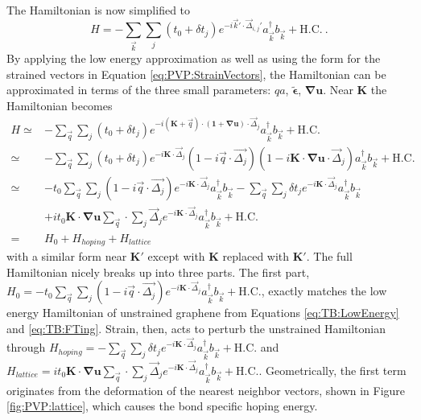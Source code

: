 The Hamiltonian is now simplified to
\begin{equation*}
    H=-\sum_{\vec{k}} \sum_{j} \left( t_0+\delta t_j \right)
    e^{-i\vec{k}'\cdot \vec{\Delta}_{i,j}'}
    a_{\vec{k}}^{\dagger} b_{\vec{k}} +\text{H.C.} \ .
\end{equation*}
By applying the low energy approximation as well as using the form for the strained vectors in Equation \ref{eq:PVP:StrainVectors}, the Hamiltonian can be approximated in terms of the three small parameters: $qa$, $\tilde{\bm{\epsilon}}$, $\bm{\nabla u}$.
Near $\bm{K}$ the Hamiltonian becomes 
\begin{align*}
  H\simeq& -\sum_{\vec{q}} \sum_{j} \left( t_0+\delta t_j \right)
    e^{-i (\bm{K}+\vec{q}) \cdot (\bm{1}+\bm{\nabla u}) \cdot \vec{\Delta}_{j}}
    a_{\vec{k}}^{\dagger} b_{\vec{k}} +\text{H.C.} \\
   \simeq& -\sum_{\vec{q}} \sum_{j} \left( t_0+\delta t_j \right) e^{-i \bm{K} \cdot \vec{\Delta}_j}
    (1-i \vec{q} \cdot \vec{\Delta_j}) (1-i\bm{K}\cdot \bm{\nabla u} \cdot \vec{\Delta}_j)
    a_{\vec{k}}^{\dagger} b_{\vec{k}} +\text{H.C.} \\
   \simeq& 
    -t_0 \sum_{\vec{q}} \sum_{j} (1-i\vec{q} \cdot \vec{\Delta_j}) e^{-i \bm{K} \cdot \vec{\Delta}_j} a_{\vec{k}}^{\dagger}b_{\vec{k}}
    -\sum_{\vec{q}} \sum_{j} \delta t_j e^{-i \bm{K} \cdot \vec{\Delta}_j} a_{\vec{k}}^{\dagger}b_{\vec{k}} \\
    &+i t_0 \bm{K} \cdot \bm{\nabla u} \sum_{\vec{q}} \cdot \sum_{j} \vec{\Delta}_j e^{-i \bm{K} \cdot \vec{\Delta}_j} a_{\vec{k}}^{\dagger}b_{\vec{k}}
    +\text{H.C.} \\
   =& H_0+H_{hoping}+H_{lattice}
\end{align*}
with a similar form near $\bm{K'}$ except with $\bm{K}$ replaced with $\bm{K'}$.
The full Hamiltonian nicely breaks up into three parts.
The first part, $H_0=-t_0 \sum_{\vec{q}} \sum_{j} (1-i\vec{q} \cdot \vec{\Delta_j}) e^{-i \bm{K} \cdot \vec{\Delta}_j} a_{\vec{k}}^{\dagger}b_{\vec{k}}+\text{H.C.}$, exactly matches the low energy Hamiltonian of unstrained graphene from Equations \ref{eq:TB:LowEnergy} and \ref{eq:TB:FTing}.
Strain, then, acts to perturb the unstrained Hamiltonian through $H_{hoping}=-\sum_{\vec{q}} \sum_{j} \delta t_j e^{-i \bm{K} \cdot \vec{\Delta}_j} a_{\vec{k}}^{\dagger}b_{\vec{k}}+\text{H.C.}$ and $H_{lattice}=i t_0 \bm{K} \cdot \bm{\nabla u} \sum_{\vec{q}} \cdot \sum_{j} \vec{\Delta}_j e^{-i \bm{K} \cdot \vec{\Delta}_j} a_{\vec{k}}^{\dagger}b_{\vec{k}}+\text{H.C.}$.
Geometrically, the first term originates from the deformation of the nearest neighbor vectors, shown in Figure \ref{fig:PVP:lattice}, which causes the bond specific hoping energy.

